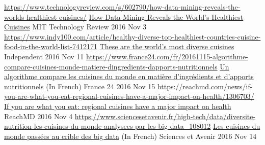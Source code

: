 
\begin{cventries}
  \cventrypress
    {\url{https://www.technologyreview.com/s/602790/how-data-mining-reveals-the-worlds-healthiest-cuisines/}}
    {\href{https://www.technologyreview.com/s/602790/how-data-mining-reveals-the-worlds-healthiest-cuisines/}{How Data Mining Reveals the World’s Healthiest Cuisines}}
    {MIT Technology Review}
    {2016 Nov 3}
  \cventrypress
    {\url{https://www.indy100.com/article/healthy-diverse-top-healthiest-countries-cuisine-food-in-the-world-list-7412171}}
    {\href{https://www.indy100.com/article/healthy-diverse-top-healthiest-countries-cuisine-food-in-the-world-list-7412171}{These are the world's most diverse cuisines}}
    {Independent}
    {2016 Nov 11}
  \cventrypress
    {\url{https://www.france24.com/fr/20161115-algorithme-compare-cuisines-monde-matiere-dingredients-dapports-nutritionnels}}
    {\href{https://www.france24.com/fr/20161115-algorithme-compare-cuisines-monde-matiere-dingredients-dapports-nutritionnels}{Un algorithme compare les cuisines du monde en matière d'ingrédients et d'apports nutritionnels} (In French)}
    {France 24}
    {2016 Nov 15}
  \cventrypress
    {\url{https://reachmd.com/news/if-you-are-what-you-eat-regional-cuisines-have-a-major-impact-on-health/1306703/}}
    {\href{https://reachmd.com/news/if-you-are-what-you-eat-regional-cuisines-have-a-major-impact-on-health/1306703/}{If you are what you eat: regional cuisines have a major impact on health}}
    {ReachMD}
    {2016 Nov 4}
  \cventrypress
    {\url{https://www.sciencesetavenir.fr/high-tech/data/diversite-nutrition-les-cuisines-du-monde-analysees-par-les-big-data_108012}}
    {\href{https://www.sciencesetavenir.fr/high-tech/data/diversite-nutrition-les-cuisines-du-monde-analysees-par-les-big-data_108012}{Les cuisines du monde passées au crible des big data} (In French)}
    {Sciences et Avenir}
    {2016 Nov 14}

    
\end{cventries}
